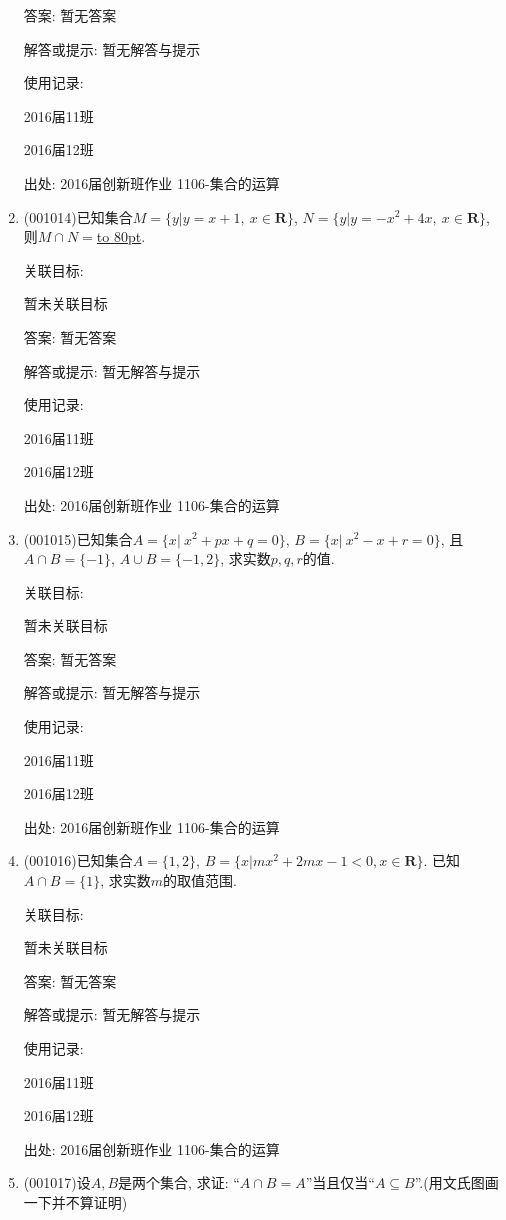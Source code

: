 \documentclass[10pt,a4paper]{article}
\newcommand{\blank}[1]{\underline{\hbox to #1pt{}}}
\begin{document}
\begin{enumerate}[1.]
答案: 暂无答案

解答或提示: 暂无解答与提示

使用记录:

2016届11班	

2016届12班	


出处: 2016届创新班作业	1106-集合的运算
\item { (001014)}已知集合$M=\{y|y=x+1, \ x \in \mathbf{R}\}$, $N=\{y|y=-x^2+4x,\  x \in \mathbf{R}\}$,
则$M \cap N=$\blank{80}.


关联目标:

暂未关联目标

答案: 暂无答案

解答或提示: 暂无解答与提示

使用记录:

2016届11班	

2016届12班	


出处: 2016届创新班作业	1106-集合的运算
\item { (001015)}已知集合$A=\{x|\ x^2+px+q=0\}$, $B=\{x|\ x^2-x+r=0\}$, 且$A\cap B=\{-1\}$, $A\cup B=\{-1,2\}$, 求实数$p,q,r$的值.


关联目标:

暂未关联目标

答案: 暂无答案

解答或提示: 暂无解答与提示

使用记录:

2016届11班	

2016届12班	


出处: 2016届创新班作业	1106-集合的运算
\item { (001016)}已知集合$A=\{1,2\}$, $B=\{x|mx^2+2mx-1<0, x \in\mathbf{R}\}$. 已知$A \cap B=\{1\}$, 求实数$m$的取值范围.


关联目标:

暂未关联目标

答案: 暂无答案

解答或提示: 暂无解答与提示

使用记录:

2016届11班	

2016届12班	


出处: 2016届创新班作业	1106-集合的运算
\item { (001017)}设$A,B$是两个集合, 求证: ``$A\cap B=A$''当且仅当``$A \subseteq B$''.(用文氏图画一下并不算证明)



\end{enumerate}
\end{document}
